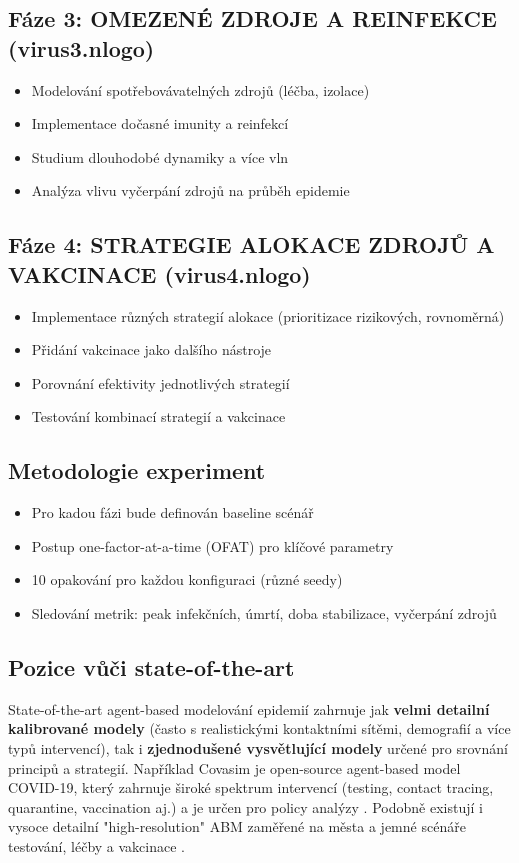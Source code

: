 \documentclass{article}
\begin{document}
\subsection{Fáze 3: OMEZENÉ ZDROJE A REINFEKCE (virus3.nlogo)}
\begin{itemize}
\item Modelování spotřebovávatelných zdrojů (léčba, izolace)
\item Implementace dočasné imunity a reinfekcí
\item Studium dlouhodobé dynamiky a více vln
\item Analýza vlivu vyčerpání zdrojů na průběh epidemie
\end{itemize}

\subsection{Fáze 4: STRATEGIE ALOKACE ZDROJŮ A VAKCINACE (virus4.nlogo)}
\begin{itemize}
\item Implementace různých strategií alokace (prioritizace rizikových, rovnoměrná)
\item Přidání vakcinace jako dalšího nástroje
\item Porovnání efektivity jednotlivých strategií
\item Testování kombinací strategií a vakcinace
\end{itemize}

\subsection{Metodologie experiment}
\begin{itemize}
\item Pro kadou fázi bude definován baseline scénář
\item Postup one-factor-at-a-time (OFAT) pro klíčové parametry
\item 10 opakování pro každou konfiguraci (různé seedy)
\item Sledování metrik: peak infekčních, úmrtí, doba stabilizace, vyčerpání zdrojů
\end{itemize}

\subsection{Pozice vůči state-of-the-art}

State-of-the-art agent-based modelování epidemií zahrnuje jak \textbf{velmi detailní kalibrované modely} (často s realistickými kontaktními sítěmi, demografií a více typů intervencí), tak i \textbf{zjednodušené vysvětlující modely} určené pro srovnání principů a strategií. Například Covasim je open-source agent-based model COVID-19, který zahrnuje široké spektrum intervencí (testing, contact tracing, quarantine, vaccination aj.) a je určen pro policy analýzy \cite{kerr-2021-covasim}. Podobně existují i vysoce detailní "high-resolution" ABM zaměřené na města a jemné scénáře testování, léčby a vakcinace \cite{truszkowska-2021-highres}.
\end{document}
